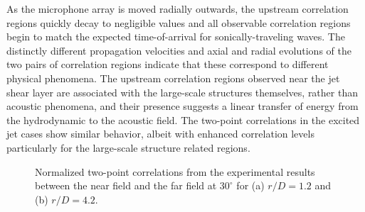 \documentclass[english]{aiaa-tc}
\begin{document}
As the microphone array is moved radially outwards, the upstream correlation regions quickly decay to negligible values and all observable correlation regions begin to match the expected time-of-arrival for sonically-traveling waves.
The distinctly different propagation velocities and axial and radial evolutions of the two pairs of correlation regions indicate that these correspond to different physical phenomena.
The upstream correlation regions observed near the jet shear layer are associated with the large-scale structures themselves, rather than acoustic phenomena, and their presence suggests a linear transfer of energy from the hydrodynamic to the acoustic field.
The two-point correlations in the excited jet cases show similar behavior, albeit with enhanced correlation levels particularly for the large-scale structure related regions.
\begin{figure}
	\begin{centering}
	\end{centering}
	\caption{Normalized two-point correlations from the experimental results between the near field and the far field at $30^\circ$ for (a) $r/D = 1.2$ and (b) $r/D = 4.2$.}
	\label{fig:exp_fullxcorr}
\end{figure}
\end{document}
